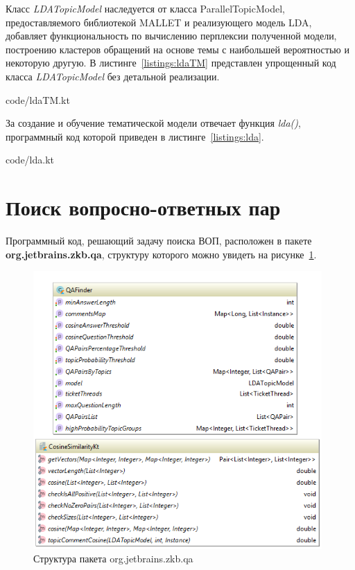Класс \textit{LDATopicModel} наследуется от класса ParallelTopicModel, предоставляемого библиотекой MALLET и реализующего модель LDA, добавляет функциональность по вычислению перплексии полученной модели, построению кластеров обращений на основе темы с наибольшей вероятностью и некоторую другую. В листинге~\ref{listings:ldaTM} представлен упрощенный код класса \textit{LDATopicModel} без детальной реализации.


{code/ldaTM.kt}

За создание и обучение тематической модели отвечает функция \textit{lda()}, программный код которой приведен в листинге~\ref{listings:lda}.


{code/lda.kt}

\section{Поиск вопросно-ответных пар}
Программный код, решающий задачу поиска ВОП, расположен в пакете \textbf{org.jetbrains.zkb.qa}, структуру которого можно увидеть на рисунке~\ref{fig:qapck}.

\begin{figure}[tph!]
\centerline{\includegraphics[width=11cm]{fig/qapck.png}}
    \caption{Структура пакета org.jetbrains.zkb.qa}
    \label{fig:qapck}
\end{figure}

